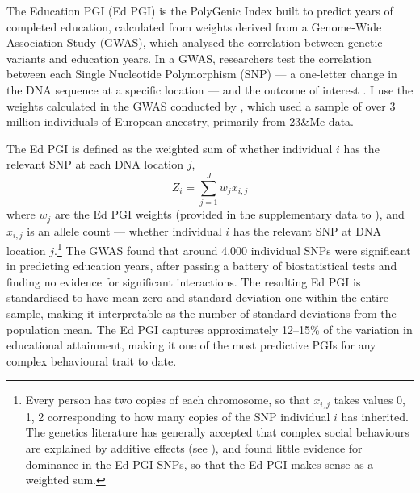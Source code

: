 The Education PGI (Ed PGI) is the PolyGenic Index built to predict years of completed education, calculated from weights derived from a Genome-Wide Association Study (GWAS), which analysed the correlation between genetic variants and education years.
In a GWAS, researchers test the correlation between each Single Nucleotide Polymorphism (SNP) --- a one-letter change in the DNA sequence at a specific location --- and the outcome of interest \citep{uffelmann2021genome}.
I use the weights calculated in the GWAS conducted by \cite{okbay2022polygenic}, which used a sample of over 3 million individuals of European ancestry, primarily from 23\&Me data.

The Ed PGI is defined as the weighted sum of whether individual $i$ has the relevant SNP at each DNA location $j$,
\[ Z_i = \sum_{j = 1}^{J} w_j x_{i,j} \]
where $w_j$ are the Ed PGI weights (provided in the supplementary data to \citealt{okbay2022polygenic}), and $x_{i,j}$ is an allele count --- whether individual $i$ has the relevant SNP at DNA location $j$.\footnote{
    Every person has two copies of each chromosome, so that $x_{i,j}$ takes values 0, 1, 2 corresponding to how many copies of the SNP individual $i$ has inherited.
    The genetics literature has generally accepted that complex social behaviours are explained by additive effects (see \citealt{hill2008data}), and \cite{okbay2022polygenic} found little evidence for dominance in the Ed PGI SNPs, so that the Ed PGI makes sense as a weighted sum.
}
The \cite{okbay2022polygenic} GWAS found that around 4,000 individual SNPs were significant in predicting education years, after passing a battery of biostatistical tests and finding no evidence for significant interactions.
The resulting Ed PGI is standardised to have mean zero and standard deviation one within the entire sample, making it interpretable as the number of standard deviations from the population mean.
The Ed PGI captures approximately 12--15\% of the variation in educational attainment, making it one of the most predictive PGIs for any complex behavioural trait to date.

